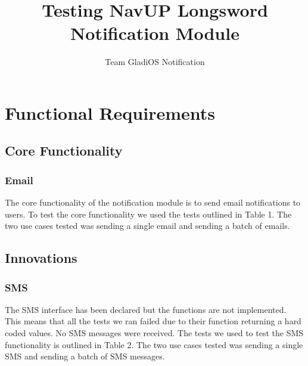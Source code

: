 \documentclass[11pt]{article}
\author{Team GladiOS Notification}
\title{Testing NavUP Longsword Notification Module}
\begin{document}
	\setlength{\parskip}{6pt}
	
	
	
	\tableofcontents
	
	\newpage
	
	\section{Functional Requirements}
	\subsection{Core Functionality}
	\subsubsection{Email}
	The core functionality of the notification module is to send email notifications to users. To test the core functionality we used the tests outlined in Table 1.
	The two use cases tested was sending a single email and sending a batch of emails.
	\subsection{Innovations}
	\subsubsection{SMS}
	The SMS interface has been declared but the functions are not implemented. This means that all the tests we ran failed due to their function returning a hard coded values. No SMS messages were received. The tests we used to test the SMS functionality is outlined in Table 2. The two use cases tested was sending a single SMS and sending a batch of SMS messages.
\end{document}

